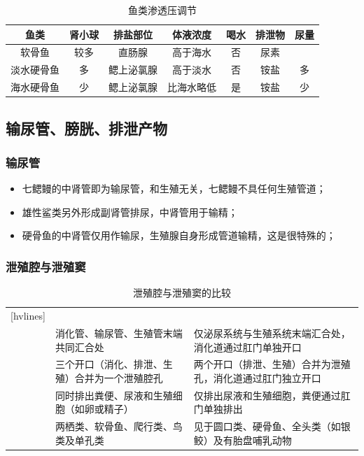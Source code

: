 \begin{table}[htbp]
	\centering
	\begin{tabularx}{\textwidth}{|C|c|C|C|c|c|c|}
		\hline
		鱼类 & 肾小球 & 排盐部位 & 体液浓度 & 喝水 & 排泄物 & 尿量 \\ \hline
		软骨鱼 & 较多 & 直肠腺 & 高于海水 & 否 & 尿素 &  \\ \hline
		淡水硬骨鱼 & 多 & 鳃上泌氯腺\footnotemark & 高于淡水 & 否 & 铵盐 & 多 \\ \hline
		海水硬骨鱼 & 少 & 鳃上泌氯腺 & 比海水略低 & 是 & 铵盐 & 少 \\ \hline
	\end{tabularx}
	\caption{鱼类渗透压调节}
	\label{tab:fish_osmotic_regulation}
\end{table}

\subsection{输尿管、膀胱、排泄产物}

\subsubsection{输尿管}

\begin{itemize}
	\item 七鳃鳗的中肾管即为输尿管，和生殖无关，七鳃鳗不具任何生殖管道；
	\item 雄性鲨类另外形成副肾管排尿，中肾管用于输精；
	\item 硬骨鱼的中肾管仅用作输尿，生殖腺自身形成管道输精，这是很特殊的；
\end{itemize}

\subsubsection{泄殖腔与泄殖窦}

\begin{table}[htbp]
	\centering
	\begin{NiceTabularX}{\textwidth}{cXX}[hvlines]
		&  &  \\
		 & 消化管、输尿管、生殖管末端共同汇合处 & 仅泌尿系统与生殖系统末端汇合处，消化道通过肛门单独开口 \\
		 & 三个开口（消化、排泄、生殖）合并为一个泄殖腔孔 & 两个开口（排泄、生殖）合并为泄殖孔，消化道通过肛门独立开口 \\
		 & 同时排出粪便、尿液和生殖细胞（如卵或精子）& 仅排出尿液和生殖细胞，粪便通过肛门单独排出 \\
		 & 两栖类、软骨鱼、爬行类、鸟类及单孔类 & 见于圆口类、硬骨鱼、全头类（如银鲛）及有胎盘哺乳动物
	\end{NiceTabularX}
	\caption{泄殖腔与泄殖窦的比较}
	\label{tab:ComparisonOfCloacaAndUrogenitalSinus}
\end{table}

